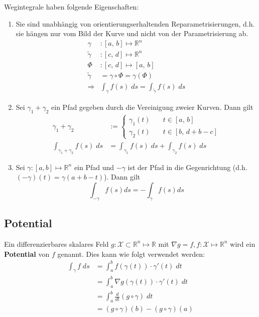 \documentclass[a4paper,10pt]{article}
\def\R{\mathbb{R}}
\def\X{\mathcal{X}}
\begin{document}
Wegintegrale haben folgende Eigenschaften:
\begin{enumerate}
  \item Sie sind unabhängig von orientierungserhaltenden Reparametrisierungen, d.h. sie hängen nur vom Bild der Kurve und nicht von der Parametrisierung ab.
  \begin{align*}
    \gamma&: [a,\, b] \mapsto \R^n\\
    \tilde{\gamma}&: [c,\, d] \mapsto \R^n\\
    \varPhi&: [c, \, d] \mapsto [a, \, b]\\
    \tilde{\gamma} &= \gamma \circ \varPhi = \gamma(\varPhi)\\
    \Rightarrow &\int_\gamma f(s) \; ds = \int_{\tilde{\gamma}} f(s) \; ds
  \end{align*}
  \item Sei \(\gamma_1 + \gamma_2\) ein Pfad gegeben durch die Vereinigung zweier Kurven. Dann gilt
  \begin{align*}
    \gamma_1 + \gamma_2 &:=
    \begin{cases}
      \gamma_1(t) \quad& t \in [a, \, b]\\
      \gamma_2(t) \quad& t \in [b, \, d + b - c]
    \end{cases}\\
    \int_{\gamma_1 + \gamma_2} f(s) \; ds &= \int_{\gamma_1} f(s) \; ds + \int_{\gamma_2} f(s)\; ds
  \end{align*}
  \item Sei \(\gamma : \left[a,b\right] \mapsto \R^n\) ein Pfad und \(-\gamma\) ist der Pfad in die Gegenrichtung (d.h. \((-\gamma)(t) = \gamma(a + b - t)\)). Dann gilt
  \[\int_{-\gamma} f(s)ds = -\int_\gamma f(s) ds\]
\end{enumerate}

\subsection{Potential}
Ein differenzierbares skalares Feld \(g: \X \subset \R^n \mapsto \R\) mit \(\nabla g = f, f: \X \mapsto \R^n\) wird ein \textbf{Potential} von \(f\) genannt. Dies kann wie folgt verwendet werden:
\begin{align*}
  \int_\gamma f \; ds &= \int_a^b f(\gamma(t)) \cdot \gamma'(t) \; dt\\
  &= \int_a^b \nabla g(\gamma(t)) \cdot \gamma'(t) \; dt\\
  &= \int_a^b \frac{d}{dt} (g \circ \gamma) \; dt\\
  &= (g \circ \gamma)(b) - (g \circ \gamma)(a)
\end{align*}
\end{document}
